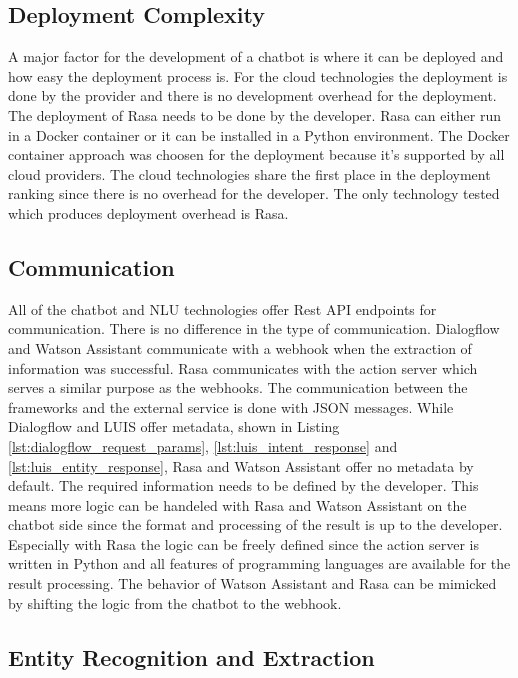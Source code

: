 \subsection*{Deployment Complexity}
A major factor for the development of a chatbot is where it can be deployed and how easy the 
deployment process is.
For the cloud technologies the deployment is done by the provider and there is no development overhead for 
the deployment.
The deployment of Rasa needs to be done by the developer.
Rasa can either run in a Docker container or it can be installed in a Python environment.
The Docker container approach was choosen for the deployment because it's supported by 
all cloud providers.
The cloud technologies share the first place in the deployment ranking since there is no overhead for the 
developer.
The only technology tested which produces deployment overhead is Rasa. 

\subsection*{Communication}
All of the chatbot and NLU technologies offer Rest API endpoints for communication.
There is no difference in the type of communication.
Dialogflow and Watson Assistant communicate with a webhook when the extraction 
of information was successful.
Rasa communicates with the action server which serves a similar purpose as the webhooks.
The communication between the frameworks and the external service is done with 
JSON messages.
While Dialogflow and LUIS offer metadata, shown in Listing \ref{lst:dialogflow_request_params}, \ref{lst:luis_intent_response}
and \ref{lst:luis_entity_response}, Rasa and Watson Assistant offer no metadata by default.
The required information needs to be defined by the developer.
This means more logic can be handeled with Rasa and Watson Assistant on the chatbot side since the 
format and processing of the result is up to the developer.
Especially with Rasa the logic can be freely defined since the action server is written in Python and 
all features of programming languages are available for the result processing.
The behavior of Watson Assistant and Rasa can be mimicked by shifting the logic from the chatbot to the webhook.

\subsection*{Entity Recognition and Extraction}

